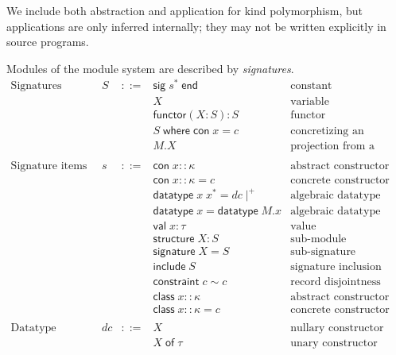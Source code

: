 \documentclass{article}
\newcommand{\mt}[1]{\mathsf{#1}}
\begin{document}
We include both abstraction and application for kind polymorphism, but applications are only inferred internally; they may not be written explicitly in source programs.

Modules of the module system are described by \emph{signatures}.
$$\begin{array}{rrcll}
  \textrm{Signatures} & S &::=& \mt{sig} \; s^* \; \mt{end} & \textrm{constant} \\
  &&& X & \textrm{variable} \\
  &&& \mt{functor}(X : S) : S & \textrm{functor} \\
  &&& S \; \mt{where} \; \mt{con} \; x = c & \textrm{concretizing an abstract constructor} \\
  &&& M.X & \textrm{projection from a module} \\
  \\
  \textrm{Signature items} & s &::=& \mt{con} \; x :: \kappa & \textrm{abstract constructor} \\
  &&& \mt{con} \; x :: \kappa = c & \textrm{concrete constructor} \\
  &&& \mt{datatype} \; x \; x^* = dc\mid^+ & \textrm{algebraic datatype definition} \\
  &&& \mt{datatype} \; x = \mt{datatype} \; M.x & \textrm{algebraic datatype import} \\
  &&& \mt{val} \; x : \tau & \textrm{value} \\
  &&& \mt{structure} \; X : S & \textrm{sub-module} \\
  &&& \mt{signature} \; X = S & \textrm{sub-signature} \\
  &&& \mt{include} \; S & \textrm{signature inclusion} \\
  &&& \mt{constraint} \; c \sim c & \textrm{record disjointness constraint} \\
  &&& \mt{class} \; x :: \kappa & \textrm{abstract constructor class} \\
  &&& \mt{class} \; x :: \kappa = c & \textrm{concrete constructor class} \\
  \\
  \textrm{Datatype constructors} & dc &::=& X & \textrm{nullary constructor} \\
  &&& X \; \mt{of} \; \tau & \textrm{unary constructor} \\
\end{array}$$
\end{document}

